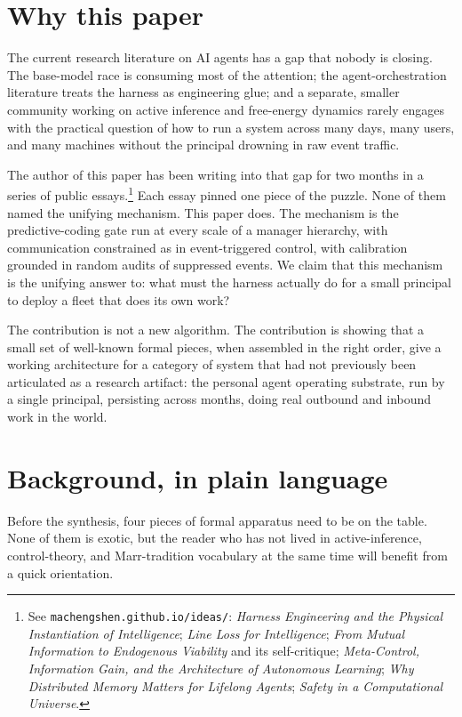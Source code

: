 \documentclass[11pt]{article}
\begin{document}
\section{Why this paper}

The current research literature on AI agents has a gap that nobody is closing. The base-model race is consuming most of the attention; the agent-orchestration literature treats the harness as engineering glue; and a separate, smaller community working on active inference and free-energy dynamics rarely engages with the practical question of how to run a system across many days, many users, and many machines without the principal drowning in raw event traffic.

The author of this paper has been writing into that gap for two months in a series of public essays.\footnote{See \texttt{machengshen.github.io/ideas/}: \emph{Harness Engineering and the Physical Instantiation of Intelligence}; \emph{Line Loss for Intelligence}; \emph{From Mutual Information to Endogenous Viability} and its self-critique; \emph{Meta-Control, Information Gain, and the Architecture of Autonomous Learning}; \emph{Why Distributed Memory Matters for Lifelong Agents}; \emph{Safety in a Computational Universe}.} Each essay pinned one piece of the puzzle. None of them named the unifying mechanism. This paper does. The mechanism is the predictive-coding gate run at every scale of a manager hierarchy, with communication constrained as in event-triggered control, with calibration grounded in random audits of suppressed events. We claim that this mechanism is the unifying answer to: what must the harness actually do for a small principal to deploy a fleet that does its own work?

The contribution is not a new algorithm. The contribution is showing that a small set of well-known formal pieces, when assembled in the right order, give a working architecture for a category of system that had not previously been articulated as a research artifact: the personal agent operating substrate, run by a single principal, persisting across months, doing real outbound and inbound work in the world.

\section{Background, in plain language}

Before the synthesis, four pieces of formal apparatus need to be on the table. None of them is exotic, but the reader who has not lived in active-inference, control-theory, and Marr-tradition vocabulary at the same time will benefit from a quick orientation.
\end{document}
